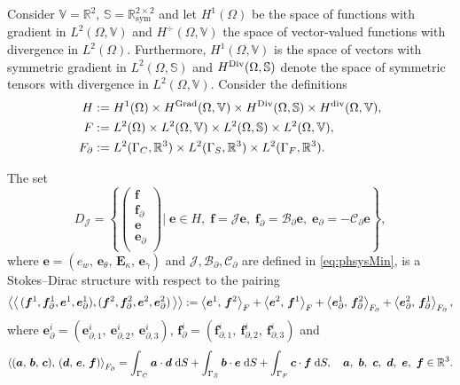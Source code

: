 \begin{conjecture}\label{conj:stdirMin}
Consider $\mathbb{V} = \mathbb{R}^2, \, \mathbb{S} = \mathbb{R}^{2\times 2}_{\text{sym}}$ and
let $H^{1}(\Omega)$ be the space of functions with gradient in $L^2(\Omega, \mathbb{V})$ and $H^{\div}  (\Omega, \mathbb{V})$ the space of vector-valued functions with divergence in $L^2(\Omega)$. Furthermore, $H^{1}(\Omega, \mathbb{V})$ is the space of vectors with symmetric gradient in $L^2(\Omega, \mathbb{S})$ and $H^{\Div}  (\Omega, \mathbb{S})$ denote the space of symmetric tensors with divergence in $L^2(\Omega, \mathbb{V})$. Consider the definitions 
\begin{align*}
H &:= H^{1}(\Omega) \times H^{\Grad}(\Omega, \mathbb{V}) \times H^{\Div}(\Omega, \mathbb{S}) \times H^{\div}(\Omega, \mathbb{V}), \\
F &:= L^2(\Omega) \times L^2(\Omega, \mathbb{V}) \times L^2(\Omega, \mathbb{S}) \times L^2(\Omega, \mathbb{V}), \\
F_\partial &:= L^2(\Gamma_C, \mathbb{R}^3) \times L^2(\Gamma_S, \mathbb{R}^3) \times L^2(\Gamma_F, \mathbb{R}^3). 
\end{align*}

The set 
\begin{equation}
{D}_{\mathcal{J}} = \left\{
\begin{pmatrix}
\bm{f} \\ \bm{f}_\partial \\ \bm{e} \\ \bm{e}_\partial \\
\end{pmatrix}
\vert \;
\bm{e} \in H, \; \bm{f} = \mathcal{J} \bm{e}, \;\bm{f}_\partial = \mathcal{B}_\partial \bm{e}, \; \bm{e}_\partial = -\mathcal{C}_\partial \bm{e}   \right\},
\end{equation}
where $\bm{e} = ({e}_w, \,\bm{e}_\theta, \, \bm{E}_\kappa, \, \bm{e}_\gamma)$ and $\mathcal{J, B_\partial, C_\partial}$ are defined in \eqref{eq:phsysMin}, is a Stokes–Dirac structure with respect to the pairing
\begin{equation}\label{eq:bilinearMin}
\bilprod{(\bm{f}^1, \bm{f}_{\partial}^1, \bm{e}^1, \bm{e}_{\partial}^1)}{(\bm{f}^2, \bm{f}_{\partial}^2, \bm{e}^2, \bm{e}_{\partial}^2)}  := \inner[F]{\bm{e}^1}{\bm{f}^2} + \inner[F]{\bm{e}^2}{\bm{f}^1} + \inner[F_\partial]{\bm{e}_{\partial}^1}{\bm{f}_{\partial}^2} + \inner[F_\partial]{\bm{e}_{\partial}^2}{\bm{f}_{\partial}^1},
\end{equation}
where $\bm{e}_{\partial}^i = (\bm{e}_{\partial, 1}^i, \ \bm{e}_{\partial, 2}^i, \ \bm{e}_{\partial, 3}^i), \, \bm{f}_{\partial}^i = (\bm{f}_{\partial, 1}^i, \ \bm{f}_{\partial, 2}^i, \ \bm{f}_{\partial, 3}^i)$ and
\begin{equation*}
\inner[F_\partial]{(\bm{a}, \, \bm{b}, \, \bm{c})}{(\bm{d}, \, \bm{e}, \, \bm{f})} = \int_{\Gamma_C} \bm{a} \cdot \bm{d} \d{S} + \int_{\Gamma_S} \bm{b} \cdot \bm{e} \d{S}  + \int_{\Gamma_F} \bm{c} \cdot \bm{f} \d{S}, \quad \bm{a},\ \bm{b},\ \bm{c},\ \bm{d},\ \bm{e},\ \bm{f} \in \mathbb{R}^3. 
\end{equation*}


\end{conjecture}
